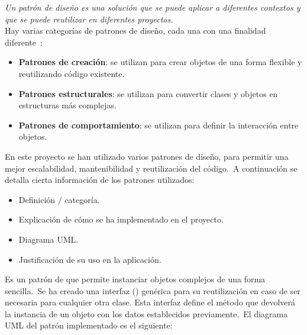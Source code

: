 
\textit{Un patrón de diseño es una solución que se puede aplicar a diferentes contextos y que se
puede reutilizar en diferentes proyectos.} \\
Hay varias categorías de patrones de diseño, cada una con una finalidad diferente~\cite{designPatternClassification}:
\begin{itemize}
	\item \textbf{Patrones de creación}: se utilizan para crear objetos de una forma flexible y reutilizando código
	existente.
	\item \textbf{Patrones estructurales}: se utilizan para convertir clases y objetos en estructuras más complejas.
	\item \textbf{Patrones de comportamiento}: se utilizan para definir la interacción entre objetos.
\end{itemize}
\label{itm:categorías-patrones}

En este proyecto se han utilizado varios patrones de diseño, para permitir una mejor escalabilidad, mantenibilidad y
reutilización del código.\ A continuación se detalla cierta información de los patrones utilizados:
\begin{itemize}
	\item Definición / categoría.
	\item Explicación de cómo se ha implementado en el proyecto.
	\item Diagrama UML\@.
	\item Justificación de su uso en la aplicación.
\end{itemize}
\label{itm:uso-patrones}

Es un patrón de  que permite instanciar objetos complejos de una forma sencilla.\ Se ha creado una
interfaz () genérica para su reutilización en caso de ser necesaria para cualquier otra clase.
Esta interfaz define el método  que devolverá la instancia de un objeto con los datos establecidos
previamente.\ El diagrama UML del patrón implementado es el siguiente:

